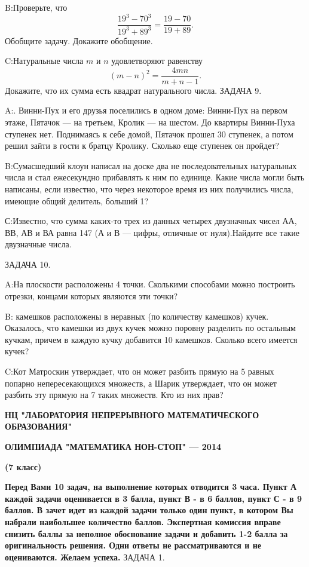 \documentclass[10pt]{scrbook} \usepackage{modules/nonstahp_book}
\begin{document}
B:\qquad Проверьте, что
$$
\frac{19^3-70^3}{19^3+89^3}=\frac{19-70}{19+89}.
$$
Обобщите задачу. Докажите обобщение.

C:\qquad Натуральные числа $m$ и $n$ удовлетворяют равенству
$$
(m-n)^2=\frac{4mn}{m+n-1}.
$$
Докажите, что их сумма есть квадрат натурального числа.
\medbreak
\noindent
 ЗАДАЧА 9.

 A:. Винни-Пух и его друзья поселились в одном доме: Винни-Пух на первом этаже, Пятачок --- на третьем, Кролик --- на шестом. До квартиры Винни-Пуха ступенек нет. Поднимаясь к себе домой, Пятачок прошел 30 ступенек, а потом решил зайти в гости к братцу Кролику. Сколько еще ступенек он пройдет?

 B:\qquad Сумасшедший клоун написал на доске два не последовательных натуральных числа и стал ежесекундно прибавлять к ним по единице. Какие числа могли быть написаны, если известно, что через некоторое время из них получились числа, имеющие общий делитель, больший 1?

С:\qquad Известно, что сумма каких-то трех из данных четырех двузначных чисел АА, ВВ, АВ и ВА равна 147 (А и В — цифры, отличные от нуля).Найдите все такие двузначные числа.

\medbreak
\noindent
ЗАДАЧА 10.

A:\qquad На плоскости расположены 4 точки. Сколькими способами можно построить отрезки, концами которых являются эти точки?

B: камешков расположены в неравных (по количеству камешков) кучек. Оказалось, что камешки из двух кучек можно поровну разделить по остальным кучкам, причем в каждую кучку добавится 10 камешков. Сколько всего имеется кучек?

C:\qquad Кот Матроскин утверждает, что он может разбить прямую
на 5 равных попарно непересекающихся множеств, а Шарик утверждает, что он может разбить эту прямую на 7 таких множеств. Кто из них прав?
\vfil\eject
\centerline{\bf НЦ "ЛАБОРАТОРИЯ НЕПРЕРЫВНОГО МАТЕМАТИЧЕСКОГО ОБРАЗОВАНИЯ"}
\centerline{\bf ОЛИМПИАДА "МАТЕМАТИКА НОН-СТОП" — 2014}
\bigbreak 
\centerline{\bf (7 класс)}
\medbreak
\noindent
{\bf Перед Вами  10  задач, на выполнение которых отводится  3 часа. Пункт А каждой задачи оценивается в 3 балла, пункт В - в 6 баллов, пункт С - в  9 баллов. В зачет идет из каждой задачи только один пункт, в котором Вы набрали наибольшее количество баллов. Экспертная комиссия вправе снизить баллы за неполное обоснование задачи и добавить 1-2 балла за оригинальность решения. Одни ответы не рассматриваются и не оцениваются. Желаем успеха.}
\medbreak
\noindent
ЗАДАЧА 1.
\end{document}
